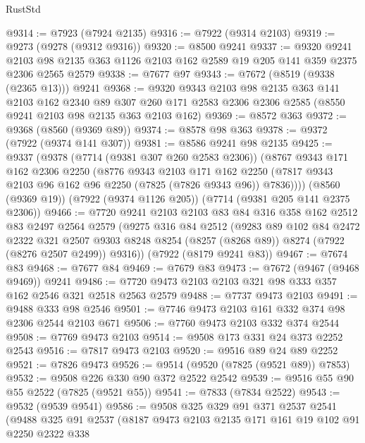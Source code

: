 \begin{lexlean}{RustStd}
\begin{coremodule}
@9314 := @7923 (@7924 @2135)
@9316 := @7922 (@9314 @2103)
@9319 := @9273 (@9278 (@9312 @9316))
@9320 := @8500 @9241
@9337 := @9320
    @9241
    @2103
    @98
    @2135
    @363
    @1126
    @2103
    @162
    @2589
    @19
    @205
    @141
    @359
    @2375
    @2306
    @2565
    @2579
@9338 := @7677 @97
@9343 := @7672 (@8519 (@9338 (@2365 @13))) @9241
@9368 := @9320
    @9343
    @2103
    @98
    @2135
    @363
    @141
    @2103
    @162
    @2340
    @89
    @307
    @260
    @171
    @2583
    @2306
    @2306
    @2585
    (@8550 @9241 @2103 @98 @2135 @363 @2103 @162)
@9369 := @8572 @363
@9372 := @9368 (@8560 (@9369 @89))
@9374 := @8578 @98 @363
@9378 := @9372 (@7922 (@9374 @141 @307))
@9381 := @8586 @9241 @98 @2135
@9425 := @9337
    (@9378
      (@7714 (@9381 @307 @260 @2583 @2306))
      (@8767
        @9343
        @171
        @162
        @2306
        @2250
        (@8776
          @9343
          @2103
          @171
          @162
          @2250
          (@7817 @9343 @2103 @96 @162 @96 @2250 (@7825 (@7826 @9343 @96)) @7836))))
    (@8560 (@9369 @19))
    (@7922 (@9374 @1126 @205))
    (@7714 (@9381 @205 @141 @2375 @2306))
@9466 := @7720
    @9241
    @2103
    @2103
    @83
    @84
    @316
    @358
    @162
    @2512
    @83
    @2497
    @2564
    @2579
    (@9275
      @316
      @84
      @2512
      (@9283
        @89
        @102
        @84
        @2472
        @2322
        @321
        @2507
        @9303
        @8248
        @8254
        (@8257 (@8268 @89))
        @8274
        (@7922 (@8276 @2507 @2499))
        @9316))
    (@7922 (@8179 @9241 @83))
@9467 := @7674 @83
@9468 := @7677 @84
@9469 := @7679 @83
@9473 := @7672 (@9467 (@9468 @9469)) @9241
@9486 := @7720 @9473 @2103 @2103 @321 @98 @333 @357 @162 @2546 @321 @2518 @2563 @2579
@9488 := @7737 @9473 @2103
@9491 := @9488 @333 @98 @2546
@9501 := @7746 @9473 @2103 @161 @332 @374 @98 @2306 @2544 @2103 @671
@9506 := @7760 @9473 @2103 @332 @374 @2544
@9508 := @7769 @9473 @2103
@9514 := @9508 @173 @331 @24 @373 @2252 @2543
@9516 := @7817 @9473 @2103
@9520 := @9516 @89 @24 @89 @2252
@9521 := @7826 @9473
@9526 := @9514 (@9520 (@7825 (@9521 @89)) @7853)
@9532 := @9508 @226 @330 @90 @372 @2522 @2542
@9539 := @9516 @55 @90 @55 @2522 (@7825 (@9521 @55))
@9541 := @7833 (@7834 @2522)
@9543 := @9532 (@9539 @9541)
@9586 := @9508
    @325
    @329
    @91
    @371
    @2537
    @2541
    (@9488
      @325
      @91
      @2537
      (@8187
        @9473
        @2103
        @2135
        @171
        @161
        @19
        @102
        @91
        @2250
        @2322
        @338

\end{coremodule}
\end{lexlean}
